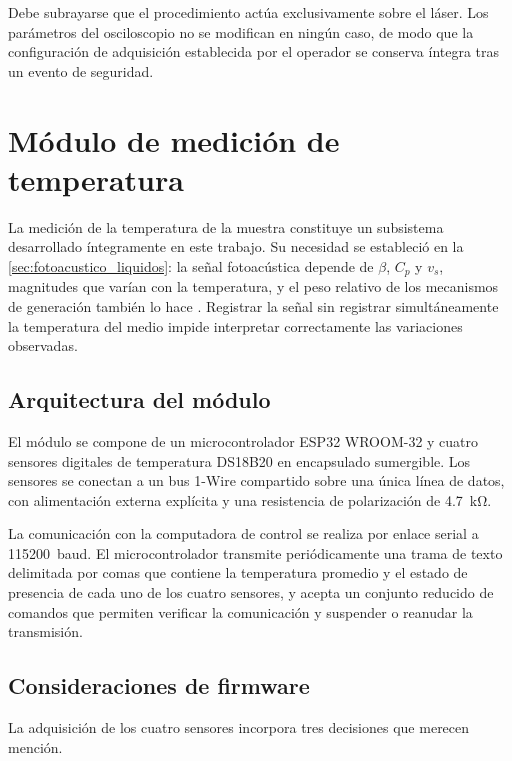 Debe subrayarse que el procedimiento actúa exclusivamente sobre el
láser. Los parámetros del osciloscopio no se modifican en ningún
caso, de modo que la configuración de adquisición establecida por el
operador se conserva íntegra tras un evento de seguridad.

\section{Módulo de medición de temperatura}
\label{sec:modulo_temperatura}

La medición de la temperatura de la muestra constituye un subsistema
desarrollado íntegramente en este trabajo. Su necesidad se estableció
en la \cref{sec:fotoacustico_liquidos}: la señal fotoacústica depende
de $\beta$, $C_p$ y $v_s$, magnitudes que varían con la temperatura,
y el peso relativo de los mecanismos de generación también lo hace
\cite{Astrath2023}. Registrar la señal sin registrar simultáneamente
la temperatura del medio impide interpretar correctamente las
variaciones observadas.

\subsection*{Arquitectura del módulo}

El módulo se compone de un microcontrolador ESP32 WROOM-32 y cuatro
sensores digitales de temperatura DS18B20 en encapsulado sumergible.
Los sensores se conectan a un bus 1-Wire compartido sobre una única
línea de datos, con alimentación externa explícita y una resistencia
de polarización de \SI{4.7}{\kilo\ohm}.

La comunicación con la computadora de control se realiza por enlace
serial a \SI{115200}{baud}. El microcontrolador transmite
periódicamente una trama de texto delimitada por comas que contiene
la temperatura promedio y el estado de presencia de cada uno de los
cuatro sensores, y acepta un conjunto reducido de comandos que
permiten verificar la comunicación y suspender o reanudar la
transmisión.

\subsection*{Consideraciones de firmware}

La adquisición de los cuatro sensores incorpora tres decisiones que
merecen mención.

